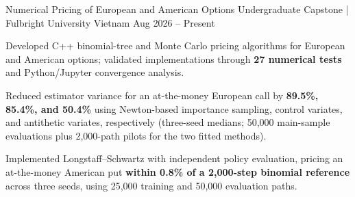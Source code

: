 \resumeProject
  {Numerical Pricing of European and American Options}
  {Undergraduate Capstone | Fulbright University Vietnam}
  {Aug 2026 -- Present}
  {}

\resumeItemListStart

  \item Developed C++ binomial-tree and Monte Carlo pricing algorithms
  for European and American options; validated implementations through
  \textbf{27 numerical tests} and Python/Jupyter convergence analysis.

  \item Reduced estimator variance for an at-the-money European call by
  \textbf{89.5\%, 85.4\%, and 50.4\%} using Newton-based importance sampling,
  control variates, and antithetic variates, respectively
  (three-seed medians; 50,000 main-sample evaluations plus 2,000-path pilots
  for the two fitted methods).

  \item Implemented Longstaff--Schwartz with independent policy evaluation,
  pricing an at-the-money American put \textbf{within 0.8\% of a
  2,000-step binomial reference} across three seeds, using 25,000
  training and 50,000 evaluation paths.

\resumeItemListEnd

\vspace{1.5mm}
